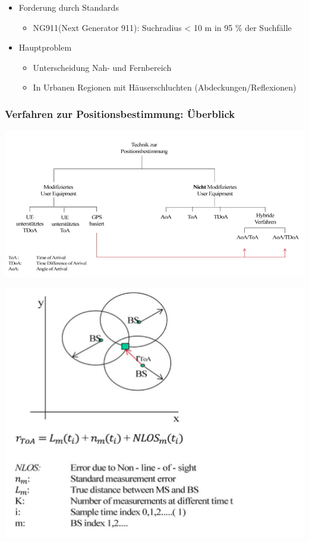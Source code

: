 \begin{itemize}
\item Forderung durch Standards
\begin{itemize}
\item NG911(Next Generator 911): Suchradius < 10 m in 95 \% der Suchfälle
\end{itemize}
\item Hauptproblem
\begin{itemize}
\item Unterscheidung Nah- und Fernbereich
\item In Urbanen Regionen mit Häuserschluchten (Abdeckungen/Reflexionen)
\end{itemize}
\end{itemize}

\subsubsection{Verfahren zur Positionsbestimmung: Überblick}

\begin{minipage}{0.7 \linewidth}
\includegraphics[width =\linewidth]{./Pics/MPS}
\end{minipage}
\begin{minipage}{0.3 \linewidth}
\includegraphics[width = \linewidth]{./Pics/TDoA}
\end{minipage}


